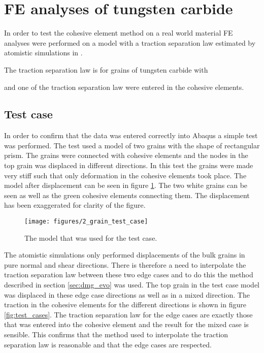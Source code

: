 \documentclass[wcco.tex]{subfiles}
\begin{document}
\FloatBarrier


\section{FE analyses of tungsten carbide}

In order to test the cohesive element method on a real world material FE analyses were performed on a model with a traction separation law estimated by atomistic simulations in \cite{Gren2013}. 

The traction separation law is for grains of tungsten carbide with 

 and one of the traction separation law were entered in the cohesive elements.
 
\subsection{Test case} 
  In order to confirm that the data was entered correctly into Abaqus a simple test was performed. The test used a model of two grains with the shape of rectangular prism. The grains were connected with cohesive elements and the nodes in the top grain was displaced in different directions. In this test the grains were made very stiff such that only deformation in the cohesive elements took place. The model after displacement can be seen in figure \ref{fig:2_grain_test_case}. The two white grains can be seen as well as the green cohesive elements connecting them. The displacement has been exaggerated for clarity of the figure.

\begin{figure}[ht]
\centering
\texttt{[image: figures/2\_grain\_test\_case]}
\caption{The model that was used for the test case.}
\label{fig:2_grain_test_case}
\end{figure}

The atomistic simulations only performed displacements of the bulk grains in pure normal and shear directions. There is therefore a need to interpolate the traction separation law between these two edge cases and to do this the method described in section \ref{sec:dmg_evo} was used. The top grain in the test case model was displaced in these edge case directions as well as in a mixed direction. The traction in the cohesive elements for the different directions is shown in figure \ref{fig:test_cases}. The traction separation law for the edge cases are exactly those that was entered into the cohesive element and the result for the mixed case is sensible. This confirms that the method used to interpolate the traction separation law is reasonable and that the edge cases are respected.
\end{document}

